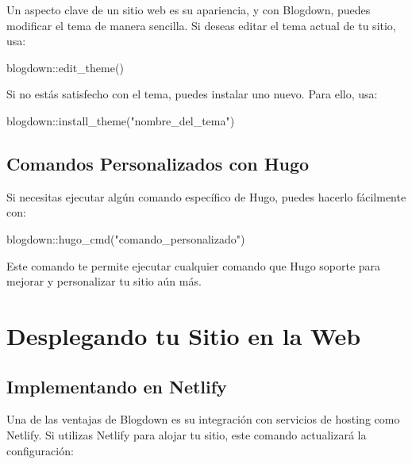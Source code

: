 \documentclass[
  doc,
  floatsintext,
  longtable,
  a4paper,
  nolmodern,
  notxfonts,
  notimes,
  colorlinks=true,linkcolor=blue,citecolor=blue,urlcolor=blue]{apa7}
\newenvironment{Shaded}{\begin{snugshade}}{\end{snugshade}}
\newcommand{\FunctionTok}[1]{\textcolor[rgb]{0.28,0.35,0.67}{#1}}
\newcommand{\NormalTok}[1]{\textcolor[rgb]{0.00,0.23,0.31}{#1}}
\newcommand{\SpecialCharTok}[1]{\textcolor[rgb]{0.37,0.37,0.37}{#1}}
\newcommand{\StringTok}[1]{\textcolor[rgb]{0.13,0.47,0.30}{#1}}
\begin{document}
Un aspecto clave de un sitio web es su apariencia, y con Blogdown,
puedes modificar el tema de manera sencilla. Si deseas editar el tema
actual de tu sitio, usa:

\begin{Shaded}
\begin{Highlighting}[]
\NormalTok{blogdown}\SpecialCharTok{::}\FunctionTok{edit\_theme}\NormalTok{()}
\end{Highlighting}
\end{Shaded}

Si no estás satisfecho con el tema, puedes instalar uno nuevo. Para
ello, usa:

\begin{Shaded}
\begin{Highlighting}[]
\NormalTok{blogdown}\SpecialCharTok{::}\FunctionTok{install\_theme}\NormalTok{(}\StringTok{"nombre\_del\_tema"}\NormalTok{)}
\end{Highlighting}
\end{Shaded}

\subsection{Comandos Personalizados con
Hugo}\label{comandos-personalizados-con-hugo}

Si necesitas ejecutar algún comando específico de Hugo, puedes hacerlo
fácilmente con:

\begin{Shaded}
\begin{Highlighting}[]
\NormalTok{blogdown}\SpecialCharTok{::}\FunctionTok{hugo\_cmd}\NormalTok{(}\StringTok{"comando\_personalizado"}\NormalTok{)}
\end{Highlighting}
\end{Shaded}

Este comando te permite ejecutar cualquier comando que Hugo soporte para
mejorar y personalizar tu sitio aún más.

\section{Desplegando tu Sitio en la
Web}\label{desplegando-tu-sitio-en-la-web}

\subsection{Implementando en Netlify}\label{implementando-en-netlify}

Una de las ventajas de Blogdown es su integración con servicios de
hosting como Netlify. Si utilizas Netlify para alojar tu sitio, este
comando actualizará la configuración:
\end{document}

